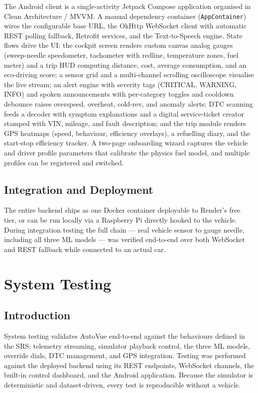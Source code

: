 \documentclass[10pt,a4paper]{report}
\begin{document}
The Android client is a single-activity Jetpack Compose application organised in Clean Architecture / MVVM. A manual dependency container (\texttt{AppContainer}) wires the configurable base URL, the OkHttp WebSocket client with automatic REST polling fallback, Retrofit services, and the Text-to-Speech engine. State flows drive the UI: the cockpit screen renders custom canvas analog gauges (sweep-needle speedometer, tachometer with redline, temperature zones, fuel meter) and a trip HUD computing distance, cost, average consumption, and an eco-driving score; a sensor grid and a multi-channel scrolling oscilloscope visualise the live stream; an alert engine with severity tags (CRITICAL, WARNING, INFO) and spoken announcements with per-category toggles and cooldown debounce raises overspeed, overheat, cold-rev, and anomaly alerts; DTC scanning feeds a decoder with symptom explanations and a digital service-ticket creator stamped with VIN, mileage, and fault description; and the trip module renders GPS heatmaps (speed, behaviour, efficiency overlays), a refuelling diary, and the start-stop efficiency tracker. A two-page onboarding wizard captures the vehicle and driver profile parameters that calibrate the physics fuel model, and multiple profiles can be registered and switched.

\section{Integration and Deployment}

The entire backend ships as one Docker container deployable to Render's free tier, or can be run locally via a Raspberry Pi directly hooked to the vehicle. During integration testing the full chain — real vehicle sensor to gauge needle, including all three ML models — was verified end-to-end over both WebSocket and REST fallback while connected to an actual car.



\chapter{System Testing}
\section{Introduction}

System testing validates AutoVue end-to-end against the behaviours defined in the SRS: telemetry streaming, simulator playback control, the three ML models, override dials, DTC management, and GPS integration. Testing was performed against the deployed backend using its REST endpoints, WebSocket channels, the built-in control dashboard, and the Android application. Because the simulator is deterministic and dataset-driven, every test is reproducible without a vehicle.
\end{document}
